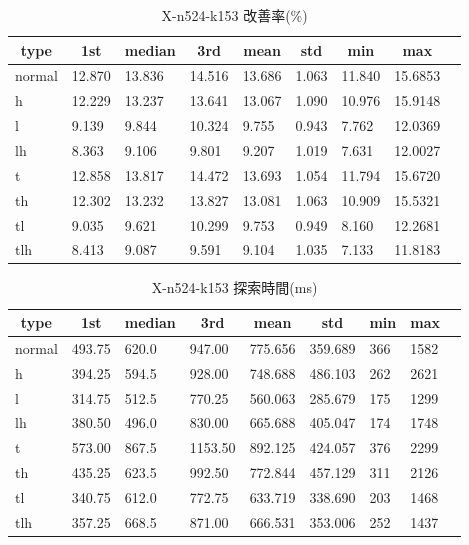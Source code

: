 \begin{table}[htbp]
    \caption{X-n524-k153 改善率(\%)}
    \begin{tabular}{|l|l|l|l|l|l|l|l|l|}\hline
    \multicolumn{1}{|c|}{\textbf{type}}
    &\multicolumn{1}{|c|}{\textbf{1st}}
    &\multicolumn{1}{c|}{\textbf{median}}
    &\multicolumn{1}{c|}{\textbf{3rd}}
    &\multicolumn{1}{c|}{\textbf{mean}}
    &\multicolumn{1}{c|}{\textbf{std}}
    &\multicolumn{1}{c|}{\textbf{min}}
    &\multicolumn{1}{c|}{\textbf{max}}\\\hline
	normal & 12.870 & 13.836 & 14.516 & 13.686 & 1.063 & 11.840 & 15.6853\\\hline
	h & 12.229 & 13.237 & 13.641 & 13.067 & 1.090 & 10.976 & 15.9148\\\hline
	l & 9.139 & 9.844 & 10.324 & 9.755 & 0.943 & 7.762 & 12.0369\\\hline
	lh & 8.363 & 9.106 & 9.801 & 9.207 & 1.019 & 7.631 & 12.0027\\\hline
	t & 12.858 & 13.817 & 14.472 & 13.693 & 1.054 & 11.794 & 15.6720\\\hline
	th & 12.302 & 13.232 & 13.827 & 13.081 & 1.063 & 10.909 & 15.5321\\\hline
	tl & 9.035 & 9.621 & 10.299 & 9.753 & 0.949 & 8.160 & 12.2681\\\hline
	tlh & 8.413 & 9.087 & 9.591 & 9.104 & 1.035 & 7.133 & 11.8183\\\hline
	\end{tabular}
\end{table}
\begin{table}[htbp]
    \caption{X-n524-k153 探索時間(ms)}
    \begin{tabular}{|l|l|l|l|l|l|l|l|l|}\hline
    \multicolumn{1}{|c|}{\textbf{type}}
    &\multicolumn{1}{|c|}{\textbf{1st}}
    &\multicolumn{1}{c|}{\textbf{median}}
    &\multicolumn{1}{c|}{\textbf{3rd}}
    &\multicolumn{1}{c|}{\textbf{mean}}
    &\multicolumn{1}{c|}{\textbf{std}}
    &\multicolumn{1}{c|}{\textbf{min}}
    &\multicolumn{1}{c|}{\textbf{max}}\\\hline
	normal & 493.75 & 620.0 & 947.00 & 775.656 & 359.689 & 366 & 1582\\\hline
	h & 394.25 & 594.5 & 928.00 & 748.688 & 486.103 & 262 & 2621\\\hline
	l & 314.75 & 512.5 & 770.25 & 560.063 & 285.679 & 175 & 1299\\\hline
	lh & 380.50 & 496.0 & 830.00 & 665.688 & 405.047 & 174 & 1748\\\hline
	t & 573.00 & 867.5 & 1153.50 & 892.125 & 424.057 & 376 & 2299\\\hline
	th & 435.25 & 623.5 & 992.50 & 772.844 & 457.129 & 311 & 2126\\\hline
	tl & 340.75 & 612.0 & 772.75 & 633.719 & 338.690 & 203 & 1468\\\hline
	tlh & 357.25 & 668.5 & 871.00 & 666.531 & 353.006 & 252 & 1437\\\hline
	\end{tabular}
\end{table}
